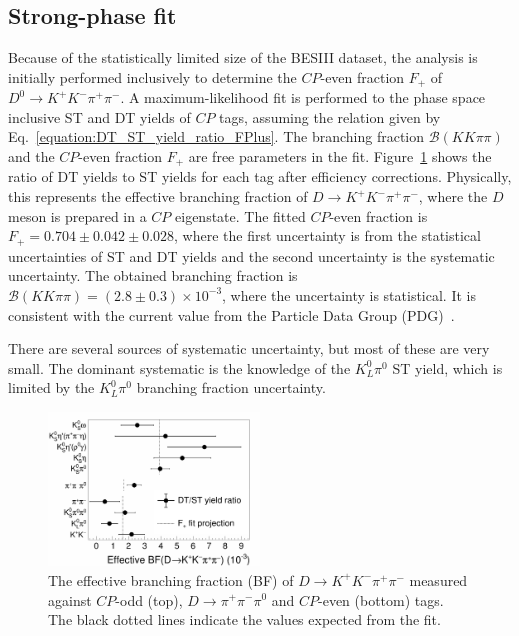 \documentclass[12pt, a4paper, notitlepage, onecolumn]{article}
\begin{document}
\subsection{Strong-phase fit}
\noindent Because of the statistically limited size of the BESIII dataset, the analysis is initially performed inclusively to determine the $C\!P$-even fraction $F_+$ of $D^0\to K^+K^-\pi^+\pi^-$. A maximum-likelihood fit is performed to the phase space inclusive ST and DT yields of $C\!P$ tags, assuming the relation given by Eq.~\eqref{equation:DT_ST_yield_ratio_FPlus}. The branching fraction $\mathcal{B}(KK\pi\pi)$ and the $C\!P$-even fraction $F_+$ are free parameters in the fit. Figure~\ref{figure:FPlus_CP_tags} shows the ratio of DT yields to ST yields for each tag after efficiency corrections. Physically, this represents the effective branching fraction of $D\to K^+K^-\pi^+\pi^-$, where the $D$ meson is prepared in a $C\!P$ eigenstate. The fitted $C\!P$-even fraction is $F_+ = 0.704 \pm 0.042 \pm 0.028$, where the first uncertainty is from the statistical uncertainties of ST and DT yields and the second uncertainty is the systematic uncertainty. The obtained branching fraction is $\mathcal{B}(KK\pi\pi) = (2.8 \pm 0.3)\times 10^{-3}$, where the uncertainty is statistical. It is consistent with the current value from the Particle Data Group (PDG)~\cite{pdg}.

There are several sources of systematic uncertainty, but most of these are very small. The dominant systematic is the knowledge of the $K^0_L\pi^0$ ST yield, which is limited by the $K^0_L\pi^0$ branching fraction uncertainty.

\begin{figure}[htb]
    \centering
    \includegraphics[width=0.5\textwidth]{Plots/CPeven_fraction_combination_CPtags.png}
    \caption{The effective branching fraction (BF) of $D\to K^+K^-\pi^+\pi^-$ measured against $C\!P$-odd (top), $D\to\pi^+\pi^-\pi^0$ and $C\!P$-even (bottom) tags. The black dotted lines indicate the values expected from the fit.}
    \label{figure:FPlus_CP_tags}
\end{figure}
\end{document}
